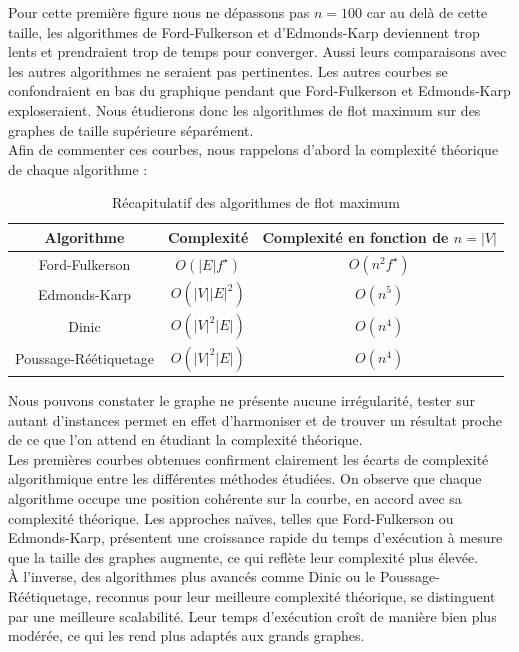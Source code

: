 \documentclass[a4paper]{article}
\begin{document}
Pour cette première figure nous ne dépassons pas $n = 100$ car au delà de cette taille, les algorithmes de Ford-Fulkerson et d'Edmonds-Karp deviennent trop lents et prendraient trop de temps pour converger. Aussi leurs comparaisons avec les autres algorithmes ne seraient pas pertinentes. Les autres courbes se confondraient en bas du graphique pendant que Ford-Fulkerson et Edmonds-Karp exploseraient. Nous étudierons donc les algorithmes de flot maximum sur des graphes de taille supérieure séparément.\\

Afin de commenter ces courbes, nous rappelons d'abord la complexité théorique de chaque algorithme :

\begin{table}[H]
	\centering
	\begin{tabular}{|c|c|c|}
		\hline
		Algorithme & Complexité & Complexité en fonction de $n = |V|$ \\
		\hline
		Ford-Fulkerson & $O(|E|f^\star)$ &$O(n^2 f^\star)$\\
		Edmonds-Karp & $O(|V||E|^2)$ &$O(n^5)$\\
		Dinic & $O(|V|^2|E|)$& $O(n^4)$\\
		Poussage-Réétiquetage & $O(|V|^2|E|)$&$O(n^4)$ \\
		\hline
	\end{tabular}
	\caption{Récapitulatif des algorithmes de flot maximum}
\end{table}

Nous pouvons constater le graphe ne présente aucune irrégularité, tester sur autant d'instances permet en effet d'harmoniser et de trouver un résultat proche de ce que l'on attend en étudiant la complexité théorique.\\

Les premières courbes obtenues confirment clairement les écarts de complexité algorithmique entre les différentes méthodes étudiées. On observe que chaque algorithme occupe une position cohérente sur la courbe, en accord avec sa complexité théorique. Les approches naïves, telles que Ford-Fulkerson ou Edmonds-Karp, présentent une croissance rapide du temps d'exécution à mesure que la taille des graphes augmente, ce qui reflète leur complexité plus élevée.\\

À l'inverse, des algorithmes plus avancés comme Dinic ou le Poussage-Réétiquetage, reconnus pour leur meilleure complexité théorique, se distinguent par une meilleure scalabilité. Leur temps d'exécution croît de manière bien plus modérée, ce qui les rend plus adaptés aux grands graphes.\\
\end{document}
